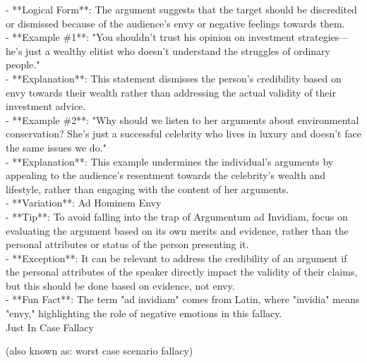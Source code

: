 \documentclass[a4paper,12pt,single,pdftex]{scrartcl}
\begin{document}
    
      - **Logical Form**: The argument suggests that the target should be discredited or dismissed because of the audience's envy or negative feelings towards them.
    \\

    
      - **Example \#1**: "You shouldn't trust his opinion on investment strategies—he's just a wealthy elitist who doesn’t understand the struggles of ordinary people."
    \\

    
      - **Explanation**: This statement dismisses the person's credibility based on envy towards their wealth rather than addressing the actual validity of their investment advice.
    \\

    
      - **Example \#2**: "Why should we listen to her arguments about environmental conservation? She's just a successful celebrity who lives in luxury and doesn't face the same issues we do."
    \\

    
      - **Explanation**: This example undermines the individual's arguments by appealing to the audience's resentment towards the celebrity’s wealth and lifestyle, rather than engaging with the content of her arguments.
    \\

    
      - **Variation**: Ad Hominem Envy
    \\

    
      - **Tip**: To avoid falling into the trap of Argumentum ad Invidiam, focus on evaluating the argument based on its own merits and evidence, rather than the personal attributes or status of the person presenting it.
    \\

    
      - **Exception**: It can be relevant to address the credibility of an argument if the personal attributes of the speaker directly impact the validity of their claims, but this should be done based on evidence, not envy.
    \\

    
      - **Fun Fact**: The term "ad invidiam" comes from Latin, where "invidia" means "envy," highlighting the role of negative emotions in this fallacy.
    \\

  

Just In Case Fallacy
    
      (also known as: worst case scenario fallacy)
    \\
\end{document}

